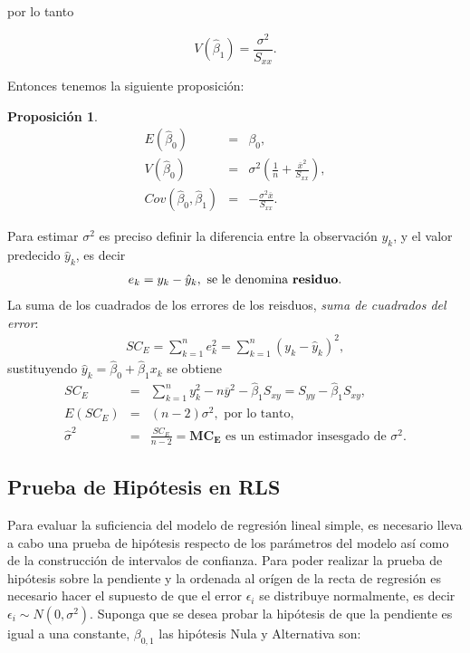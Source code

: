 \documentclass[a4paper]{report} %
\newtheorem{Prop}{Proposición}[chapter]
\begin{document}
por lo tanto

\begin{equation}\label{Varianza.Beta.1.Original}
V\left(\hat{\beta}_{1}\right)=\frac{\sigma^{2}}{S_{xx}}.
\end{equation}

Entonces tenemos la siguiente proposici\'on: 
\begin{Prop}
\begin{eqnarray}
E\left(\hat{\beta}_{0}\right)&=&\beta_{0},\\
V\left(\hat{\beta}_{0}\right)&=&\sigma^{2}\left(\frac{1}{n}+\frac{\overline{x}^{2}}{S_{xx}}\right),\\
Cov\left(\hat{\beta}_{0},\hat{\beta}_{1}\right)&=&-\frac{\sigma^{2}\overline{x}}{S_{xx}}.
\end{eqnarray}
\end{Prop}
Para estimar $\sigma^{2}$ es preciso definir la diferencia entre la observaci\'on $y_{k}$, y el valor predecido $\hat{y}_{k}$, es decir
\begin{eqnarray*}
e_{k}=y_{k}-\hat{y}_{k},\textrm{ se le denomina \textbf{residuo}.}
\end{eqnarray*}
La suma de los cuadrados de los errores de los reisduos, \textit{suma de cuadrados del error}:
\begin{eqnarray}
SC_{E}=\sum_{k=1}^{n}e_{k}^{2}=\sum_{k=1}^{n}\left(y_{k}-\hat{y}_{k}\right)^{2},
\end{eqnarray}
sustituyendo $\hat{y}_{k}=\hat{\beta}_{0}+\hat{\beta}_{1}x_{k}$ se obtiene
\begin{eqnarray}
SC_{E}&=&\sum_{k=1}^{n}y_{k}^{2}-n\overline{y}^{2}-\hat{\beta}_{1}S_{xy}=S_{yy}-\hat{\beta}_{1}S_{xy},\\
E\left(SC_{E}\right)&=&\left(n-2\right)\sigma^{2},\textrm{ por lo tanto,}\\
\hat{\sigma}^{2}&=&\frac{SC_{E}}{n-2}=\mathbf{MC_{E}}\textrm{ es un estimador insesgado de }\sigma^{2}.
\end{eqnarray}

\subsection{Prueba de Hip\'otesis en RLS}

Para evaluar la suficiencia del modelo de regresi\'on lineal simple, es necesario lleva a cabo una prueba de hip\'otesis respecto de los par\'ametros del modelo as\'i como de la construcci\'on de intervalos de confianza. Para poder realizar la prueba de hip\'otesis sobre la pendiente y la ordenada al or\'igen de la recta de regresi\'on es necesario hacer el supuesto de que el error $\epsilon_{i}$ se distribuye normalmente, es decir $\epsilon_{i} \sim N\left(0,\sigma^{2}\right)$. Suponga que se desea probar la hip\'otesis de que la pendiente es igual a una constante, $\beta_{0,1}$ las hip\'otesis Nula y Alternativa son:
\end{document}
